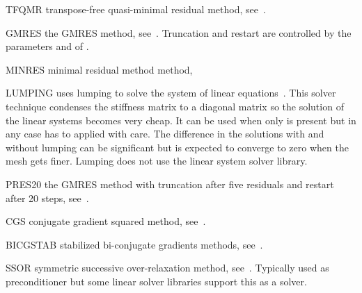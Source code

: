 \begin{memberdesc}[SolverOptions]{TFQMR}
transpose-free quasi-minimal residual method, see~. \end{memberdesc}

\begin{memberdesc}[SolverOptions]{GMRES}
the GMRES method, see~. Truncation and restart are controlled by the parameters
 and  of .
\end{memberdesc}

\begin{memberdesc}[SolverOptions]{MINRES}
minimal residual method method,  \end{memberdesc}

\begin{memberdesc}[SolverOptions]{LUMPING}
uses lumping to solve the system of linear equations~. This solver technique
condenses the stiffness matrix to a diagonal matrix so the solution of the linear systems becomes very cheap. It can be used when
only  is present but in any case has to applied with care. The difference in the solutions with and without lumping can be significant
but is expected to converge to zero when the mesh gets finer.
Lumping does not use the linear system solver library.
\end{memberdesc}

\begin{memberdesc}[SolverOptions]{PRES20}
the GMRES method with truncation after five residuals and
restart after 20 steps, see~.
\end{memberdesc}

\begin{memberdesc}[SolverOptions]{CGS}
conjugate gradient squared method, see~.
\end{memberdesc}

\begin{memberdesc}[SolverOptions]{BICGSTAB}
stabilized bi-conjugate gradients methods, see~.
\end{memberdesc}

\begin{memberdesc}[SolverOptions]{SSOR}
symmetric successive over-relaxation method, see~. Typically used as preconditioner but some linear solver libraries support
this as a solver.
\end{memberdesc}

